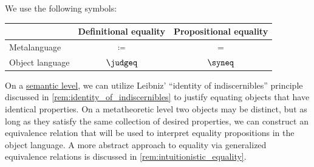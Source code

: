 \begin{concept}
  We use the following symbols:
  \begin{center}
    \begin{tabular}{lcc}
      \toprule
                      & Definitional equality & Propositional equality \\
      \midrule
      Metalanguage    & \( \coloneqq \)       & \( = \)      \\
      Object language & \( \judgeq \)         & \( \syneq \) \\
      \bottomrule
    \end{tabular}
  \end{center}

  On a \hyperref[con:syntax_semantics_duality]{semantic level}, we can utilize Leibniz' \enquote{identity of indiscernibles} principle discussed in \cref{rem:identity_of_indiscernibles} to justify equating objects that have identical properties. On a metatheoretic level two objects may be distinct, but as long as they satisfy the same collection of desired properties, we can construct an equivalence relation that will be used to interpret equality propositions in the object language. A more abstract approach to equality via generalized equivalence relations is discussed in \cref{rem:intuitionistic_equality}.
\end{concept}

